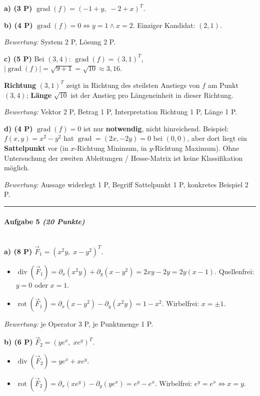 \documentclass[11pt, a4paper]{article}
\begin{document}
\textbf{a) (3 P)} $\operatorname{grad}(f) = (-1+y,\; -2+x)^T$.


\textbf{b) (4 P)} $\operatorname{grad}(f) = 0 \Leftrightarrow y=1 \wedge x=2$. Einziger Kandidat: $(2,1)$.

\textit{Bewertung:} System 2 P, Lösung 2 P.


\textbf{c) (5 P)} Bei $(3,4)$: $\operatorname{grad}(f) = (3, 1)^T$, $|\operatorname{grad}(f)| = \sqrt{9+1} = \sqrt{10} \approx 3{,}16$.

\textbf{Richtung} $(3,1)^T$ zeigt in Richtung des steilsten Anstiegs von $f$ am Punkt $(3,4)$; \textbf{Länge} $\sqrt{10}$ ist der Anstieg pro Längeneinheit in dieser Richtung.

\textit{Bewertung:} Vektor 2 P, Betrag 1 P, Interpretation Richtung 1 P, Länge 1 P.


\textbf{d) (4 P)} $\operatorname{grad}(f) = 0$ ist nur \textbf{notwendig}, nicht hinreichend. Beispiel: $f(x,y) = x^2 - y^2$ hat $\operatorname{grad} = (2x, -2y) = 0$ bei $(0,0)$, aber dort liegt ein \textbf{Sattelpunkt} vor (in $x$-Richtung Minimum, in $y$-Richtung Maximum). Ohne Untersuchung der zweiten Ableitungen / Hesse-Matrix ist keine Klassifikation möglich.

\textit{Bewertung:} Aussage widerlegt 1 P, Begriff Sattelpunkt 1 P, konkretes Beispiel 2 P.



\noindent\textcolor{rulegray}{\rule{\linewidth}{0.4pt}}


\paragraph{Aufgabe 5 \textit{(20 Punkte)}}\mbox{}\\[2pt]

\textbf{a) (8 P)} $\vec{F}_1 = (x^2y,\; x-y^2)^T$.

\begin{itemize}
  \item $\operatorname{div}(\vec{F}_1) = \partial_x(x^2y) + \partial_y(x-y^2) = 2xy - 2y = 2y(x-1)$. Quellenfrei: $y=0$ oder $x=1$.
  \item $\operatorname{rot}(\vec{F}_1) = \partial_x(x-y^2) - \partial_y(x^2y) = 1 - x^2$. Wirbelfrei: $x=\pm 1$.
\end{itemize}

\textit{Bewertung:} je Operator 3 P, je Punktmenge 1 P.


\textbf{b) (6 P)} $\vec{F}_2 = (ye^x,\; xe^y)^T$.

\begin{itemize}
  \item $\operatorname{div}(\vec{F}_2) = ye^x + xe^y$.
  \item $\operatorname{rot}(\vec{F}_2) = \partial_x(xe^y) - \partial_y(ye^x) = e^y - e^x$. Wirbelfrei: $e^y = e^x \Leftrightarrow x=y$.
\end{itemize}
\end{document}
